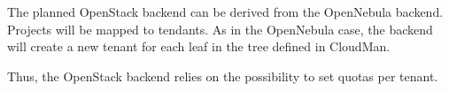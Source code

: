 The planned OpenStack backend can be derived from the OpenNebula backend. Projects will be mapped to tendants. 
As in the OpenNebula case, the backend will create a new tenant for each leaf in the tree defined in CloudMan.

Thus, the OpenStack backend relies on the possibility to set quotas per tenant. 
 
